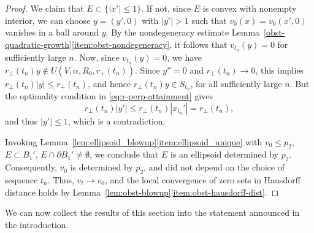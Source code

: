 \documentclass[11pt]{amsart}
\numberwithin{equation}{section}
\numberwithin{figure}{section}
\theoremstyle{plain}
\theoremstyle{definition}
\theoremstyle{remark}
\theoremstyle{plain}
\begin{document}
\begin{proof}
We claim that $E\subset\{|x'|\leq1\}$. If not, since $E$ is convex with
nonempty interior, we can choose $y=(y',0)$ with $|y'|>1$ such that
$v_0(x)=v_0(x',0)$ vanishes in a ball around $y$. By the nondegeneracy
estimate Lemma~\ref{obst-quadratic-growth}\ref{item:obst-nondegeneracy}, it
follows that $v_{t_n}(y)=0$ for sufficiently large $n$.
Now, since $v_{t_n}(y)=0$, we have
$r_\perp(t_n) y\notin U(V,\alpha,R_0,r_+(t_n))$.
Since $y''=0$ and $r_\perp(t_n)\to0$, this implies
$r_\perp(t_n)|y|\leq r_+(t_n)$, and hence
$r_\perp(t_n)y\in S_{t_n}$, for all sufficiently large $n$.
But the optimality condition in \eqref{eq:r-perp-attainment} gives
\[
    r_\perp(t_n)|y'|
    \leq r_\perp(t_n)|x_{t_n}'|
    = r_\perp(t_n),
\]
and thus $|y'|\leq1$, which is a contradiction.

Invoking Lemma~\ref{lem:ellipsoid_blowup}\ref{item:ellipsoid_unique} with $v_0 \leq p_2$, $E\subset \overline{B_1'}$, $E\cap \partial B_1'\neq\emptyset$, we conclude that $E$ is an ellipsoid determined by $p_2$. Consequently, $v_0$ is determined by $p_2$, and did not depend on the choice of sequence $t_n$. Thus, $v_t \to v_0$, and the local convergence of zero sets in Hausdorff distance holds by Lemma~\ref{lem:obst-blowup}\ref{item:obst-hausdorff-dist}.

\end{proof}

We can now collect the results of this section into the statement announced in
the introduction.
\end{document}

